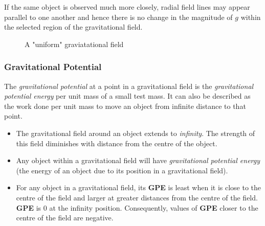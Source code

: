 \documentclass[12pt]{article}
\begin{document}
If the same object is observed much more closely, radial field lines may appear parallel to one another and hence there is no change in the magnitude of \(g\) within the selected region of the gravitational field.

\begin{figure}[H]
\centering
{}
\caption{A "uniform" graviatational field}
\end{figure}

\subsubsection{Gravitational Potential}
\label{sec:org62ef38f}

The \emph{gravitational potential} at a point in a gravitational field is the \emph{gravitational potential energy} per unit mass of a small test mass. It can also be described as the work done per unit mass to move an object from infinite distance to that point.

\begin{itemize}
\item The gravitational field around an object extends to \emph{infinity}. The strength of this field diminishes with distance from the centre of the object.

\item Any object within a gravitational field will have \emph{gravitational potential energy} (the energy of an object due to its position in a gravitational field).

\item For any object in a gravitational field, its \textbf{GPE} is least when it is close to the centre of the field and larger at greater distances from the centre of the field. \textbf{GPE} is \(0\) at the infinity position. Consequently, values of \textbf{GPE} closer to the centre of the field are negative.
\end{itemize}
\end{document}
